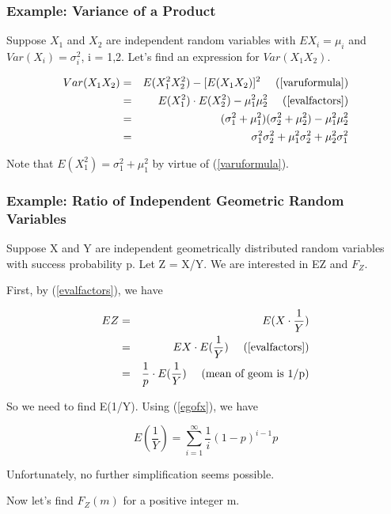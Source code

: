 \subsubsection{Example:  Variance of a Product}

Suppose $X_1$ and $X_2$ are independent random variables with $EX_i =
\mu_i$ and $Var(X_i) = \sigma^2_i$, i = 1,2.  Let's find an expression
for $Var(X_1 X_2)$.

\begin{eqnarray}
Var(X_1 X_2) &=& E(X^2_1 X^2_2) - [E(X_1 X_2)]^2 ~~~~ 
   \textrm{(\ref{varuformula})}  \\ 
&=& E(X^2_1) \cdot E(X^2_2) - \mu^2_1 \mu^2_2 
   ~~~~ \textrm{(\ref{evalfactors})} \\
&=& (\sigma^2_1 + \mu^2_1) (\sigma^2_2 + \mu^2_2) - \mu^2_1 \mu^2_2 \\
&=& \sigma^2_1 \sigma^2_2 
+ \mu^2_1 \sigma^2_2
+ \mu^2_2 \sigma^2_1
\end{eqnarray}

Note that $E(X^2_1) = \sigma^2_1 + \mu^2_1$ by virtue of
(\ref{varuformula}).

\subsubsection{Example:  Ratio of Independent Geometric Random Variables}

Suppose X and Y are independent geometrically distributed
random variables with success probability p.  Let Z = X/Y.  We are
interested in EZ and $F_Z$.

First, by (\ref{evalfactors}), we have

\begin{eqnarray}
EZ &=& E(X \cdot \frac{1}{Y}) \\ 
&=& EX \cdot E(\frac{1}{Y}) ~~~~ (\ref{evalfactors}) \\ 
&=& \frac{1}{p} \cdot E(\frac{1}{Y}) ~~~~ \textrm{(mean of geom is 1/p)} 
\end{eqnarray}

So we need to find E(1/Y).  Using (\ref{egofx}), we have

\begin{equation}
E(\frac{1}{Y}) = \sum_{i=1}^{\infty} \frac{1}{i} (1-p)^{i-1} p
\end{equation}



Unfortunately, no further simplification seems possible.

Now let's find $F_Z(m)$ for a positive integer m.

